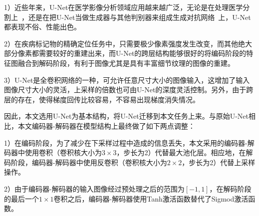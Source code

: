 1）近些年来，U-Net在医学影像分析领域应用越来越广泛，无论是在处理医学分割上~\cite{oktay2018attention, dong2017automatic, zhang2018ct}，还是在把U-Net当做生成器与其他判别器来组成生成对抗网络~\cite{Han2018SpineGANSS}上，U-Net都表现不俗、性能出色。

2）在疾病标记物的精确定位任务中，只需要极少像素强度发生改变，而其他绝大部分像素都需要较好的重建出来，而U-Net的跨层结构能够很好的将编码阶段的特征图融合到解码阶段，有利于图像尤其是具有丰富细节纹理的图像的重建。

3）U-Net是全卷积网络的一种，可允许任意尺寸大小的图像输入，这增加了输入图像尺寸大小的灵活，上采样的倍数也可由U-Net的深度灵活控制。另外，由于跨层的存在，使得梯度回传比较容易，不容易出现梯度消失情况。

因此，本文选用U-Net为基本结构，将U-Net迁移到本文任务上来。与原始U-Net相比，本文编码器-解码器在模型结构上最终做了如下两点调整：

1）在编码阶段，为了减少在下采样过程中造成的信息丢失，本文采用的编码器-解码器中使用卷积（卷积核大小为$3\times 3$，步长为2）代替最大池化层。相应地，在解码阶段，编码器-解码器中使用反卷积（卷积核大小为$2\times 2$，步长为2）代替上采样操作。

2）由于编码器-解码器的输入图像经过预处理之后的范围为$[-1,1]$，在解码阶段的最后一个$1\times 1$卷积之后，编码器-解码器使用Tanh激活函数替代了Sigmod激活函数。

